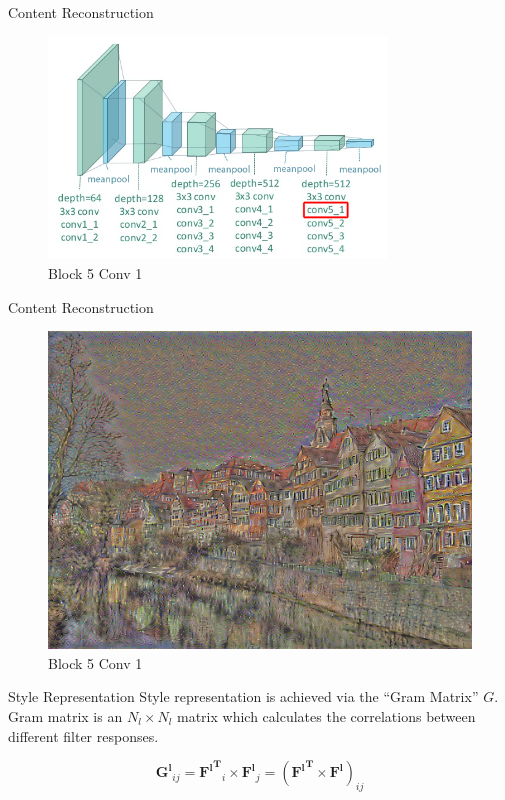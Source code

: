 \documentclass{beamer}
\begin{document}
\begin{frame}{Content Reconstruction}
\begin{figure}[ht]
\centering
\includegraphics[width=0.8\textwidth]{img/vgg19/content/block5_conv1}
\caption*{Block 5 Conv 1}
\end{figure}
\end{frame}
\begin{frame}{Content Reconstruction}
\begin{figure}[ht]
\centering
\includegraphics[width=.8\textwidth]{img/content/block5_conv1}
\caption*{Block 5 Conv 1}
\end{figure}
\end{frame}




\begin{frame}{Style Representation}
Style representation is achieved via the ``Gram Matrix'' $G$. Gram matrix is
an $N_l \times N_l$ matrix which calculates the correlations between
different filter responses.

\begin{equation}
    \mathbf{G^l}_{ij} = \mathbf{{F^l}^T}_i \times \mathbf{F^l}_j
    = (\mathbf{{F^l}^T} \times \mathbf{F^l})_{ij}
\end{equation}
\end{frame}
\end{document}
